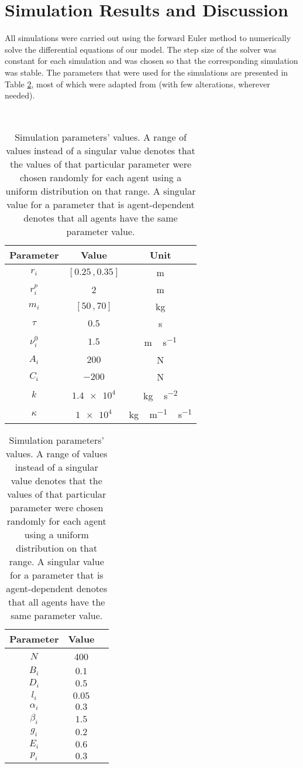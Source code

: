 \section{Simulation Results and Discussion} \label{sec:6-simulation}
All simulations were carried out using the forward Euler method to numerically solve the differential equations of our model. The step size of the solver was constant for each simulation and was chosen so that the corresponding simulation was stable. The parameters that were used for the simulations are presented in Table \ref{tab:param}, most of which were adapted from \cite{Wang2016} (with few alterations, wherever needed).

\begin{table}[ht!]
	\, \hfill
	\begin{tabular}{c c c}
		\hline
		Parameter & Value & Unit \\ \hline
		$r_i$ & $[0.25 \,, 0.35]$ & \si{\meter} \\
		$r_i^p$ & 2 & \si{\meter} \\
		$m_i$ & $[50 \,, 70]$ & \si{\kilogram} \\
		$\tau$ & $0.5$ & \si{\second} \\
		$\nu_i^0$ & $1.5$ & \si{\meter\,\second^{-1}} \\
		$A_i$ & $200$ & \si{\newton} \\
		$C_i$ & $-200$ & \si{\newton} \\
		$k$ & $\num{1.4e4}$ & \si{\kilogram\,\second^{-2}} \\
		$\kappa$ & $\num{1e4}$ & \si{\kilogram\,\meter^{-1}\,\second^{-1}} \\
	\end{tabular}
	\hfill
	\begin{tabular}{c c c}
		\hline
		Parameter & Value & \\ \hline
		$N$ & 400 & \\
		$B_i$ & $0.1$ &  \\
		$D_i$ & $0.5$ &  \\
		$l_i$ & $0.05$ &  \\
		$\alpha_i$ & $0.3$ &  \\
		$\beta_i$ & $1.5$ &  \\
		$g_i$ & $0.2$ &  \\
		$E_i$ & $0.6$ &  \\
		$p_i$ & $0.3$ &  \\
	\end{tabular}
	\hfill \,
	\caption{Simulation parameters' values. A range of values instead of a singular value denotes that the values of that particular parameter were chosen randomly for each agent using a uniform distribution on that range. A singular value for a parameter that is agent-dependent denotes that all agents have the same parameter value.}
	\label{tab:param}
\end{table}

